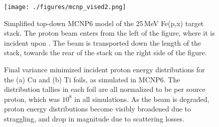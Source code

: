 \begin{figure}
 \centering
 \texttt{[image: ./figures/mcnp\_vised2.png]}
\caption{ Simplified top-down MCNP6 model of the 25\,MeV  Fe(p,x) target stack. The  proton beam enters from the left of the figure, where it is incident upon . The beam is transported down the length of the stack, towards the rear of the stack on the right side of the figure.
}
 \label{fig:fe_vised_25}
\end{figure}





\begin{figure}
    \centering    
    \caption{ Final variance minimized incident proton energy distributions for the (a) Cu and (b) Ti foils, as simulated in MCNP6. The distribution tallies in each foil are all normalized to be per source proton, which was $10^8$ in all simulations. As the beam is degraded, proton energy distributions become visibly broadened due to straggling, and drop in magnitude due to scattering losses.}
     \label{fig:fe_ptallies_appendix}
\end{figure}



